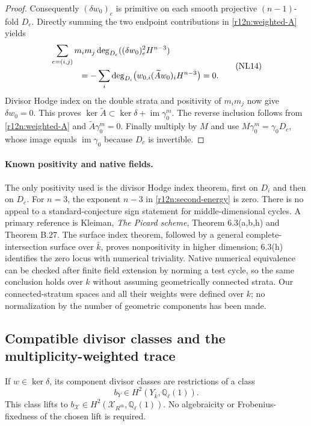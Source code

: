 \begin{proof}
Consequently $(\delta w_0)_e$ is primitive on each smooth projective
$(n-1)$-fold $D_e$.  Directly summing the two endpoint contributions
in \eqref{r12n:weighted-A} yields
\[
 \begin{split}
 &\sum_{e=(i,j)}m_im_j
       \deg_{D_e}((\delta w_0)_e^2H^{n-3})\\
 &\hspace{12mm}=-\sum_i
       \deg_{D_i}\bigl(w_{0,i}(\widetilde Aw_0)_iH^{n-3}\bigr)=0.
 \end{split}
\tag{NL14}\label{r12n:second-energy}
\]
Divisor Hodge index on the double strata and positivity of $m_im_j$
now give $\delta w_0=0$.  This proves
$\ker\widetilde A\subset\ker\delta+\operatorname{im}\gamma_0^m$.
The reverse inclusion follows from \eqref{r12n:weighted-A} and
$\widetilde A\gamma_0^m=0$.  Finally multiply by $M$ and use
$M\gamma_0^m=\gamma_0D_c$, whose image equals
$\operatorname{im}\gamma_0$ because $D_c$ is invertible.
\end{proof}

\paragraph{Known positivity and native fields.}
The only positivity used is the divisor Hodge index theorem, first on
$D_i$ and then on $D_e$.  For $n=3$, the exponent $n-3$ in
\eqref{r12n:second-energy} is zero.  There is no appeal to a
standard-conjecture sign statement for middle-dimensional cycles.
A primary reference is Kleiman, \emph{The Picard scheme}, Theorem
6.3(a,b,h) and Theorem B.27.  The surface index theorem, followed by
a general complete-intersection surface over $\bar k$, proves
nonpositivity in higher dimension; 6.3(h) identifies the zero locus
with numerical triviality.  Native numerical equivalence can be
checked after finite field extension by norming a test cycle, so the
same conclusion holds over $k$ without assuming geometrically
connected strata.  Our connected-stratum spaces and all their
weights were defined over $k$; no normalization by the number of
geometric components has been made.

\subsection{Compatible divisor classes and the multiplicity-weighted trace}

\begin{lemma}
\label{r12n:cohom-lift}
If $w\in\ker\delta$, its component divisor classes are restrictions
of a class
\[
      b_Y\in H^2(Y_{\bar k},\mathbb Q_\ell(1)).
\]
This class lifts to
$b_{\mathcal X}\in H^2(\mathcal X_{R^{\mathrm{sh}}},\mathbb Q_\ell(1))$.
No algebraicity or Frobenius-fixedness of the chosen lift is required.
\end{lemma}

